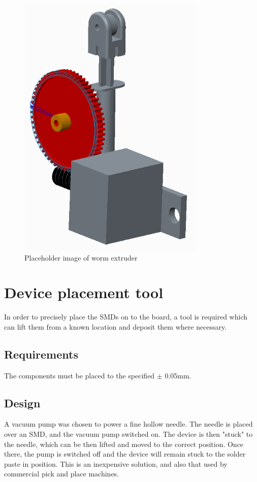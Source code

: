 \begin{figure}[ht!]
\centering
\includegraphics[width=90mm]{resources/extruder_worm.png}
\caption{Placeholder image of worm extruder}
\label{wormextruder}
\end{figure}



\section{Device placement tool}
In order to precisely place the SMDs on to the board, a tool is required
which can lift them from a known location and deposit them where necessary.

\subsection{Requirements}
The components must be placed to the specified $\pm$ 0.05mm.

\subsection{Design}
A vacuum pump was chosen to power a fine hollow needle. The needle
is placed over an SMD, and the vacuum pump switched on. The device
is then "stuck" to the needle, which can be then lifted and moved to
the correct position. Once there, the pump is switched off and the
device will remain stuck to the solder paste in position. This is an
inexpensive solution, and also that used by commercial pick and place
machines.

